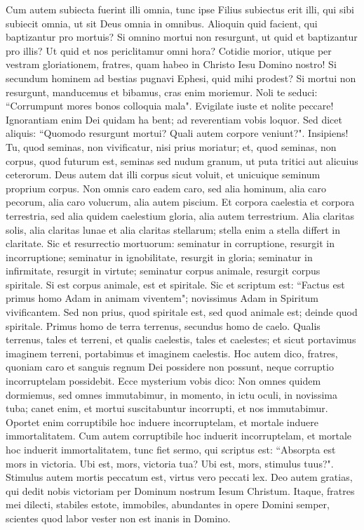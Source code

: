 \begin{biblechapter}
\verse Cum autem subiecta fuerint illi omnia, tunc ipse Filius subiectus erit illi, qui sibi subiecit omnia, ut sit Deus omnia in omnibus. 
\verse Alioquin quid facient, qui baptizantur pro mortuis? Si omnino mortui non resurgunt, ut quid et baptizantur pro illis? 
\verse Ut quid et nos periclitamur omni hora? 
\verse Cotidie morior, utique per vestram gloriationem, fratres, quam habeo in Christo Iesu Domino nostro! 
\verse Si secundum hominem ad bestias pugnavi Ephesi, quid mihi prodest? Si mortui non resurgunt, manducemus et bibamus, cras enim moriemur. 
\verse Noli te seduci: “Corrumpunt mores bonos colloquia mala". 
\verse Evigilate iuste et nolite peccare! Ignorantiam enim Dei quidam ha bent; ad reverentiam vobis loquor. 
\verse Sed dicet aliquis: “Quomodo resurgunt mortui? Quali autem corpore veniunt?". 
\verse Insipiens! Tu, quod seminas, non vivificatur, nisi prius moriatur; 
\verse et, quod seminas, non corpus, quod futurum est, seminas sed nudum granum, ut puta tritici aut alicuius ceterorum. 
\verse Deus autem dat illi corpus sicut voluit, et unicuique seminum proprium corpus. 
\verse Non omnis caro eadem caro, sed alia hominum, alia caro pecorum, alia caro volucrum, alia autem piscium. 
\verse Et corpora caelestia et corpora terrestria, sed alia quidem caelestium gloria, alia autem terrestrium.  
\verse Alia claritas solis, alia claritas lunae et alia claritas stellarum; stella enim a stella differt in claritate. 
\verse Sic et resurrectio mortuorum: seminatur in corruptione, resurgit in incorruptione; 
\verse seminatur in ignobilitate, resurgit in gloria; seminatur in infirmitate, resurgit in virtute;  
\verse seminatur corpus animale, resurgit corpus spiritale. Si est corpus animale, est et spiritale. 
\verse Sic et scriptum est: “Factus est primus homo Adam in animam viventem"; novissimus Adam in Spiritum vivificantem. 
\verse Sed non prius, quod spiritale est, sed quod animale est; deinde quod spiritale. 
\verse Primus homo de terra terrenus, secundus homo de caelo. 
\verse Qualis terrenus, tales et terreni, et qualis caelestis, tales et caelestes; 
\verse et sicut portavimus imaginem terreni, portabimus et imaginem caelestis. 
\verse Hoc autem dico, fratres, quoniam caro et sanguis regnum Dei possidere non possunt, neque corruptio incorruptelam possidebit. 
\verse Ecce mysterium vobis dico: Non omnes quidem dormiemus, sed omnes immutabimur, 
\verse in momento, in ictu oculi, in novissima tuba; canet enim, et mortui suscitabuntur incorrupti, et nos immutabimur. 
\verse Oportet enim corruptibile hoc induere incorruptelam, et mortale induere immortalitatem. 
\verse Cum autem corruptibile hoc induerit incorruptelam, et mortale hoc induerit immortalitatem, tunc fiet sermo, qui scriptus est: “Absorpta est mors in victoria. 
\verse Ubi est, mors, victoria tua? Ubi est, mors, stimulus tuus?". 
\verse Stimulus autem mortis peccatum est, virtus vero peccati lex. 
\verse Deo autem gratias, qui dedit nobis victoriam per Dominum nostrum Iesum Christum. 
\verse Itaque, fratres mei dilecti, stabiles estote, immobiles, abundantes in opere Domini semper, scientes quod labor vester non est inanis in Domino. 
\end{biblechapter}


